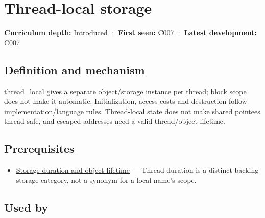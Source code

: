 \hypertarget{appendix-3b88c6cd7195}{}\label{referencestart:appendix-3b88c6cd7195}
\section{Thread-local storage}\label{appendix-3b88c6cd7195-thread-local-storage}

\hypertarget{appendix-3b88c6cd7195-thread-local-storage}{}

\textbf{Curriculum depth:} Introduced · \textbf{First seen:} C007 · \textbf{Latest development:} C007

\begin{allmightroledefinition}

\subsection{Definition and mechanism}\label{appendix-3b88c6cd7195-definition-and-mechanism}

\hypertarget{appendix-3b88c6cd7195-definition-and-mechanism}{}

thread\_local gives a separate object/storage instance per thread; block scope does not make it automatic. Initialization, access costs and destruction follow implementation/language rules. Thread-local state does not make shared pointees thread-safe, and escaped addresses need a valid thread/object lifetime.

\end{allmightroledefinition}

\subsection{Prerequisites}\label{appendix-3b88c6cd7195-prerequisites}

\hypertarget{appendix-3b88c6cd7195-prerequisites}{}

\begin{itemize}
\tightlist
\item
  \hyperref[appendix-0b104bcba06b]{Storage duration and object lifetime} --- Thread duration is a distinct backing-storage category, not a synonym for a local name's scope.
\end{itemize}

\subsection{Used by}\label{appendix-3b88c6cd7195-used-by}

\hypertarget{appendix-3b88c6cd7195-used-by}{}

